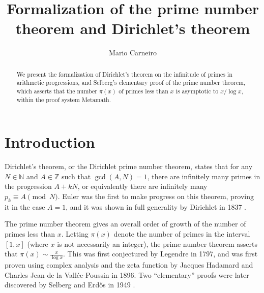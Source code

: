 \documentclass[runningheads,a4paper]{llncs}
\begin{document}
\mainmatter  %

\title{Formalization of the prime number theorem and Dirichlet's theorem}


\author{Mario Carneiro}
%


\maketitle


\begin{abstract}
We present the formalization of Dirichlet's theorem on the infinitude of primes in arithmetic progressions, and Selberg's elementary proof of the prime number theorem, which asserts that the number $\pi(x)$ of primes less than $x$ is asymptotic to $x/\log x$, within the proof system Metamath.
\end{abstract}


\section{Introduction}\label{sec:intro}
Dirichlet's theorem, or the Dirichlet prime number theorem, states that for any $N\in\mathbb N$ and $A\in\mathbb Z$ such that $\gcd(A,N)=1$, there are infinitely many primes in the progression $A+kN$, or equivalently there are infinitely many $p_k\equiv A\pmod N$. Euler was the first to make progress on this theorem, proving it in the case $A=1$, and it was shown in full generality by Dirichlet in 1837 \cite{dirichlet}.

The prime number theorem gives an overall order of growth of the number of primes less than $x$. Letting $\pi(x)$ denote the number of primes in the interval $[1,x]$ (where $x$ is not necessarily an integer), the prime number theorem asserts that $\pi(x)\sim\frac x{\log x}$. This was first conjectured by Legendre in 1797, and was first proven using complex analysis and the zeta function by Jacques Hadamard and Charles Jean de la Vall\'{e}e-Poussin in 1896. Two ``elementary'' proofs were later discovered by Selberg and Erd\H{o}s in 1949 \cite{selberg,erdos}.
\end{document}
